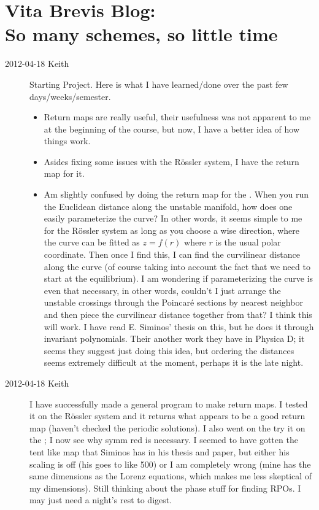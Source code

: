 
\section{Vita Brevis Blog: \\ So many schemes, so little time}
\begin{description}
\item[2012-04-18 Keith] Starting Project.  Here is what I have
learned/done over the past few days/weeks/semester.
    \begin{itemize}
    \item Return maps are really useful, their usefulness was not
    apparent to me at the beginning of the course, but now, I have a
    better idea of how things work.

    \item Asides fixing some issues with the R\"ossler system, I have the
    return map for it.

    \item Am slightly confused by doing the return map for the \cLe.
    When you run the Euclidean distance along the unstable manifold, how
    does one easily parameterize the curve?  In other words, it seems
    simple to me for the R\"ossler system as long as you choose a wise
    direction, where the curve can be fitted as $z = f(r)$ where $r$ is
    the usual polar coordinate.  Then once I find this, I can find the
    curvilinear distance along the curve (of course taking into account
    the fact that we need to start at the equilibrium). I am wondering if
    parameterizing the curve is even that necessary, in other words,
    couldn't I just arrange the unstable crossings through the Poincar\'e
    sections by nearest neighbor and then piece the curvilinear distance
    together from that?  I think this will work.  I have read E. Siminos'
    thesis on this, but he does it through invariant polynomials.  Their
    another work they have in Physica D; it seems they suggest just doing
    this idea, but ordering the distances seems extremely difficult at
    the moment, perhaps it is the late night.
        \end{itemize}

\item[2012-04-18 Keith] I have successfully made a general program to
make return maps.  I tested it on the R\"ossler system and it returns
what appears to be a good return map (haven't checked the periodic
solutions).  I also went on the try it on the \cLf; I now see
why symm red is necessary.  I seemed to have gotten the tent like map
that Siminos has in his thesis and paper, but either his scaling is off
(his goes to like 500) or I am completely wrong (mine has the same
dimensions as the Lorenz equations, which makes me less skeptical of my
dimensions).  Still thinking about the phase stuff for finding RPOs.  I
may just need a night's rest to digest.


\end{description}

